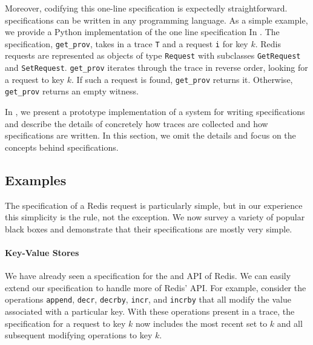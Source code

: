 Moreover, codifying this one-line \watprovenance{} specification is expectedly
straightforward. \Watprovenance{} specifications can be written in any
programming language. As a simple example, we provide a Python implementation
of the one line \watprovenance{} specification In .  The
specification, \texttt{get\_prov}, takes in a trace \texttt{T} and a \kvget{}
request \texttt{i} for key $k$. Redis requests are represented as objects of
type \texttt{Request} with subclasses \texttt{GetRequest} and
\texttt{SetRequest}.  \texttt{get\_prov} iterates through the trace in reverse
order, looking for a \kvset{} request to key $k$. If such a \kvset{} request is
found, \texttt{get\_prov} returns it. Otherwise, \texttt{get\_prov} returns an
empty witness.

{}

In , we present a prototype implementation of a system for
writing \watprovenance{} specifications and describe the details of concretely
how traces are collected and how \watprovenance{} specifications are written.
In this section, we omit the details and focus on the concepts behind
\watprovenance{} specifications.

\subsection{Examples}
The \watprovenance{} specification of a Redis \kvget{} request is particularly
simple, but in our experience this simplicity is the rule, not the exception.
We now survey a variety of popular black boxes and demonstrate that their
\watprovenance{} specifications are mostly very simple.

\paragraph{Key-Value Stores}
We have already seen a \watprovenance{} specification for the \kvget{} and
\kvset{} API of Redis. We can easily extend our \watprovenance{} specification
to handle more of Redis' API. For example, consider the operations
\texttt{append}, \texttt{decr}, \texttt{decrby}, \texttt{incr}, and
\texttt{incrby} that all modify the value associated with a particular key.
With these operations present in a trace, the \watprovenance{} specification
for a \kvget{} request to key $k$ now includes the most recent set to $k$ and
all subsequent modifying operations to key $k$.

